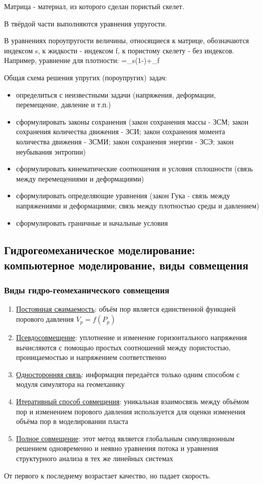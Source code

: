 \documentclass[main.tex]{subfiles}
\begin{document}
Матрица - материал, из которого сделан пористый скелет.

В твёрдой части выполняются уравнения упругости.

В уравнениях пороупругости величины, относящиеся к матрице, обозначаются индексом s, к жидкости - индексом f, к пористому скелету - без индексов.
Например, уравнение для плотности:
\beq
\rho=\rho_s\left(1-\varphi\right)+\rho_f\varphi
\eeq

Общая схема решения упругих (пороупругих) задач:
\begin{itemize}
\item определиться с неизвестными задачи (напряжения, деформации, перемещение, давление и т.п.)
\item сформулировать законы сохранения (закон сохранения массы - ЗСМ; закон сохранения количества движения - ЗСИ; закон сохранения момента количества движения - ЗСМИ; закон сохранения энергии - ЗСЭ; закон неубывания энтропии)
\item сформулировать кинематические соотношения и условия сплошности (связь между перемещениями и деформациями)
\item сформулировать определяющие уравнения (закон Гука - связь между напряжениями и деформациями; связь между плотностью среды и давлением)
\item сформулировать граничные и начальные условия
\end{itemize}

\subsection{Гидрогеомеханическое моделирование: компьютерное моделирование, виды совмещения}

\subsubsection{Виды гидро-геомеханического совмещения}

\begin{enumerate}
\item \underline{Постоянная сжимаемость}: объём пор является единственной функцией порового давления $V_p=f(P_p)$
\item \underline{Псевдосовмещение}: уплотнение и изменение горизонтального напряжения вычисляются с помощью простых соотношений между пористостью, проницаемостью и напряжением соответственно
\item \underline{Односторонняя связь}: информация передаётся только одним способом с модуля симулятора на геомеханику
\item \underline{Итеративный способ совмещения}: уникальная взаимосвязь между объёмом пор и изменением порового давления используется для оценки изменения объёма пор в моделировании пласта
\item \underline{Полное совмещение}: этот метод является глобальным симуляционным решением одновременно и неявно уравнения потока и уравнения структурного анализа в тех же линейных системах
\end{enumerate}

От первого к последнему возрастает качество, но падает скорость.


\end{document}
